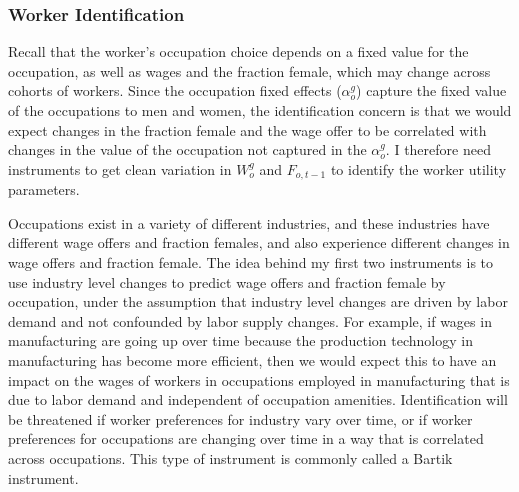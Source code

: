 \documentclass[12pt]{article}
\begin{document}







\subsubsection{Worker Identification}

Recall that the worker's occupation choice depends on a fixed value for the occupation, as well as wages and the fraction female, which may change across cohorts of workers. Since the occupation fixed effects ($\alpha^g_o$) capture the fixed value of the occupations to men and women, the identification concern is that we would expect changes in the fraction female and the wage offer to be correlated with changes in the value of the occupation not captured in the $\alpha^g_o$. I therefore need instruments to get clean variation in $W^g_o$ and $F_{o,t-1}$ to identify the worker utility parameters.

Occupations exist in a variety of different industries, and these industries have different wage offers and fraction females, and also experience different changes in wage offers and fraction female. The idea behind my first two instruments is to use industry level changes to predict wage offers and fraction female by occupation, under the assumption that industry level changes are driven by labor demand and not confounded by labor supply changes. For example, if wages in manufacturing are going up over time because the production technology in manufacturing has become more efficient, then we would expect this to have an impact on the wages of workers in occupations employed in manufacturing that is due to labor demand and independent of occupation amenities. Identification will be threatened if worker preferences for industry vary over time, or if worker preferences for occupations are changing over time in a way that is correlated across occupations. This type of instrument is commonly called a Bartik instrument.
 
\end{document}
